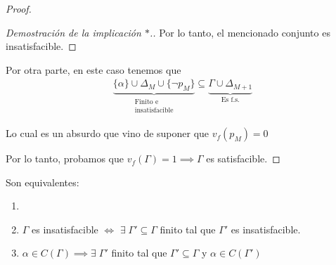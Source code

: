 \begin{itemize}[align=right]
\begin{enumerate}
\begin{proof}
\begin{enumerate}
\begin{proof}[Demostración de la implicación $*$.]
                    Por lo tanto, el mencionado conjunto es insatisfacible.

                    \end{proof}

                    \medskip

                    Por otra parte, en este caso tenemos que
                    \begin{gather*}
                        \underbrace{\{ \alpha \} \cup \Delta_M 
                        \cup \{ \neg p_M \}}_{\substack{\text{Finito e} \\
                        \text{insatisfacible}}}
                        \subseteq \underbrace{\Gamma \cup 
                        \Delta_{M+1}}_{\text{Es f.s.}}
                    \end{gather*}

                    Lo cual es un absurdo que vino de suponer que $v_f(p_M)=0$

                \end{enumerate}

                Por lo tanto, probamos que $v_f(\Gamma)= 1 \implies \Gamma$ es
                satisfacible.

                \end{proof}
       \end{enumerate} 
\end{itemize}

\begin{proposicion}{}{}
    Son equivalentes:
    \begin{enumerate}[label=\protect\circled{\arabic*}]
        \item {}
        \item $\Gamma$ es insatisfacible 
            $\iff$ $\exists \; \Gamma' \subseteq \Gamma$ 
            finito tal que $\Gamma'$ es insatisfacible.
        \item $\alpha \in C(\Gamma) \implies 
            \exists \; \Gamma'$ finito tal que $\Gamma' \subseteq \Gamma$ y
            $\alpha \in C(\Gamma')$
    \end{enumerate}
\end{proposicion}

